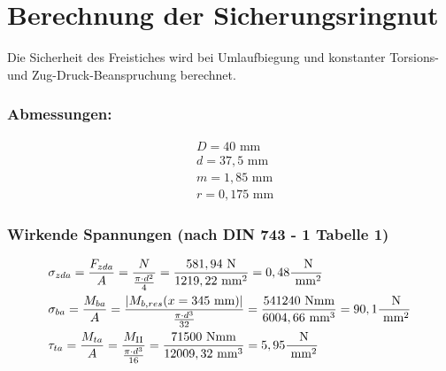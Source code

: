 \section{Berechnung der Sicherungsringnut}
Die Sicherheit des Freistiches wird bei Umlaufbiegung und konstanter Torsions- und Zug-Druck-Beanspruchung berechnet.
\subsubsection{Abmessungen:}
\begin{align*}
&D= 40 \text{ mm}  \\
&d= 37,5 \text{ mm}  \\
& m= 1,85 \text{ mm} \\
& r= 0,175 \text{ mm} 
\end{align*}
\subsubsection{Wirkende Spannungen (nach DIN 743 - 1 Tabelle 1)}
\begin{align*}
&\sigma_{zda} = \frac{F_{zda}}{A} = \frac{N}{\frac{\pi \cdot d^2}{4}} = \frac{581,94 \text{ N}}{1219,22 \text{ mm}^2} = 0,48 \frac{\text{ N}}{\text{ mm}^2} \\
&\sigma_{ba} = \frac{M_{ba}}{A} = \frac{|M_{b,res}(x=345 \text{ mm}) |}{\frac{\pi \cdot d^3}{32}} = \frac{541240 \text{ Nmm}}{6004,66 \text{ mm}^3} = 90,1 \frac{\text{ N}}{\text{ mm}^2} \\
&\tau_{ta} = \frac{M_{ta}}{A} = \frac{M_{\mathrm{II}}}{\frac{\pi \cdot d^3}{16}} = \frac{71500 \text{ Nmm}}{12009,32 \text{ mm}^3} = 5,95 \frac{\text{ N}}{\text{ mm}^2} 
\end{align*}
